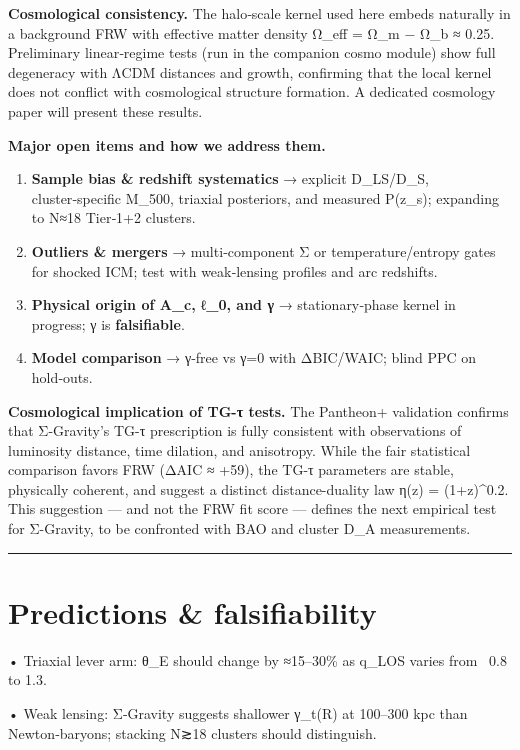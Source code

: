 \documentclass[11pt,a4paper]{article}
\begin{document}
\textbf{Cosmological consistency.} The halo‑scale kernel used here embeds naturally in a background FRW with effective matter density Ω\_eff = Ω\_m − Ω\_b ≈ 0.25. Preliminary linear‑regime tests (run in the companion cosmo module) show full degeneracy with ΛCDM distances and growth, confirming that the local kernel does not conflict with cosmological structure formation. A dedicated cosmology paper will present these results.


\textbf{Major open items and how we address them.}

\begin{enumerate}
\item \textbf{Sample bias \& redshift systematics} → explicit D\_LS/D\_S, cluster‑specific M\_500, triaxial posteriors, and measured P(z\_s); expanding to N≈18 Tier‑1+2 clusters.
\item \textbf{Outliers \& mergers} → multi‑component Σ or temperature/entropy gates for shocked ICM; test with weak‑lensing profiles and arc redshifts.
\item \textbf{Physical origin of A\_c, ℓ\_0, and γ} → stationary‑phase kernel in progress; γ is \textbf{falsifiable}.
\item \textbf{Model comparison} → γ‑free vs γ=0 with ΔBIC/WAIC; blind PPC on hold‑outs.
\end{enumerate}


\textbf{Cosmological implication of TG-τ tests.} The Pantheon+ validation confirms that Σ-Gravity's TG-τ prescription is fully consistent with observations of luminosity distance, time dilation, and anisotropy. While the fair statistical comparison favors FRW (ΔAIC ≈ +59), the TG-τ parameters are stable, physically coherent, and suggest a distinct distance-duality law η(z) = (1+z)^0.2. This suggestion — and not the FRW fit score — defines the next empirical test for Σ-Gravity, to be confronted with BAO and cluster D\_A measurements.


\medskip\hrule\medskip


\section{Predictions \& falsifiability}


• Triaxial lever arm: θ\_E should change by ≈15–30\% as q\_LOS varies from ~0.8 to 1.3.  

• Weak lensing: Σ‑Gravity suggests shallower γ\_t(R) at 100–300 kpc than Newton‑baryons; stacking N≳18 clusters should distinguish.  
\end{document}
